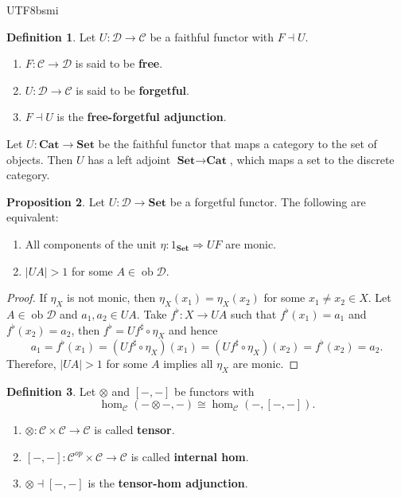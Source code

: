 \documentclass[12pt]{article}
\theoremstyle{definition}
\newtheorem{definition}{Definition}[section]
\newtheorem{property}[definition]{Proposition}
\newcommand\<{\langle}
\renewcommand\>{\rangle}
\DeclareMathOperator{\ob}{ob}
\begin{document}
\begin{CJK}{UTF8}{bsmi}
\begin{definition}
    Let $U:\mathcal{D}\to\mathcal{C}$ be a faithful functor with $F\dashv U$.
    \begin{enumerate}
        \item $F:\mathcal{C}\to\mathcal{D}$ is said to be \textbf{free}.
        \item $U:\mathcal{D}\to\mathcal{C}$ is said to be \textbf{forgetful}.
        \item $F\dashv U$ is the \textbf{free-forgetful adjunction}.
    \end{enumerate}
\end{definition}

Let $U:\textbf{Cat}\to\textbf{Set}$ be the faithful functor that maps a category to the set of objects.
Then $U$ has a left adjoint $\textbf{Set}\to\textbf{Cat}$, which maps a set to the discrete category.

\begin{property}
    Let $U:\mathcal{D}\to\textbf{Set}$ be a forgetful functor.
    The following are equivalent:
    \begin{enumerate}
        \item All components of the unit $\eta:1_\textbf{Set}\Rightarrow UF$ are monic.
        \item $|UA|>1$ for some $A\in\ob\mathcal{D}$.
    \end{enumerate}
\end{property}
\begin{proof}
    If $\eta_X$ is not monic, then $\eta_X(x_1)=\eta_X(x_2)$ for some $x_1\ne x_2\in X$.
    Let $A\in\ob\mathcal{D}$ and $a_1, a_2\in UA$.
    Take $f^\flat:X\to UA$ such that $f^\flat(x_1)=a_1$ and $f^\flat(x_2)=a_2$, then $f^\flat=Uf^\sharp\circ\eta_X$ and hence
    \[
        a_1 = f^\flat(x_1) = (Uf^\sharp\circ\eta_X)(x_1) = (Uf^\sharp\circ\eta_X)(x_2) = f^\flat(x_2) = a_2.
    \]
    Therefore, $|UA|>1$ for some $A$ implies all $\eta_X$ are monic.
\end{proof}

\begin{definition}
    Let $\otimes$ and $[-, -]$ be functors with
    \[
        \hom_\mathcal{C}(-\otimes-, -) \cong \hom_\mathcal{C}(-, [-, -]).
    \]
    \begin{enumerate}
        \item $\otimes:\mathcal{C}\times\mathcal{C}\to\mathcal{C}$ is called \textbf{tensor}.
        \item $[-, -]:\mathcal{C}^{op}\times\mathcal{C}\to\mathcal{C}$ is called \textbf{internal hom}.
        \item $\otimes\dashv[-, -]$ is the \textbf{tensor-hom adjunction}.
    \end{enumerate}
\end{definition}


\end{CJK}
\end{document}
